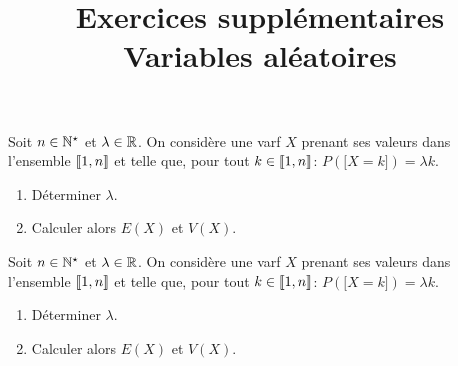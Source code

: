 \documentclass[a4paper, 11pt,reqno]{article}
\begin{document}
\title{ Exercices supplémentaires Variables aléatoires}

\begin{exercice}
	Soit $n\in\mathbb{N}^{\star}$ et $\lambda \in\mathbb{R}$. On consid\`ere une varf $X$ prenant ses valeurs dans l'ensemble $\llbracket  1,n\rrbracket$ et telle que, pour tout $k\in\llbracket  1,n\rrbracket$: $P(\lbrack X=k\rbrack)=\lambda k$.
	\begin{enumerate}
		\item D\'eterminer $\lambda$.
		\item Calculer alors $E(X)$ et $V(X)$.
	\end{enumerate}
\end{exercice}
\begin{correction}
	Soit $n\in\mathbb{N}^{\star}$ et $\lambda \in\mathbb{R}$. On consid\`ere une varf $X$ prenant ses valeurs dans l'ensemble $\llbracket  1,n\rrbracket$ et telle que, pour tout $k\in\llbracket  1,n\rrbracket$: $P(\lbrack X=k\rbrack)=\lambda k$.
	\begin{enumerate}
		\item D\'eterminer $\lambda$.
		\item Calculer alors $E(X)$ et $V(X)$.
	\end{enumerate}
\end{correction}






\end{document}
